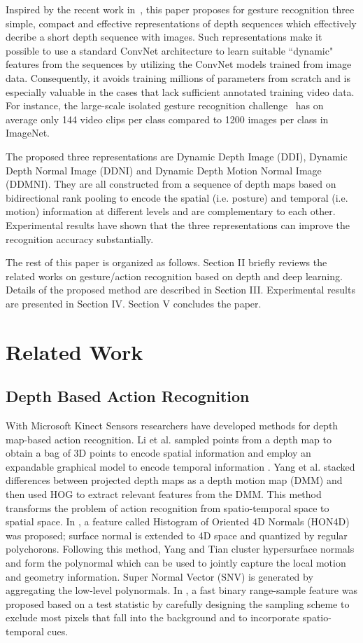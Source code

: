\documentclass[10pt, a4paper, conference]{IEEEtran}
\begin{document}
Inspired by the recent work in~\cite{pichao2015,pichaoTHMS,pichao2016,bilen2016dynamic}, this paper proposes for gesture recognition three simple, compact and effective representations of depth sequences which effectively decribe a short depth sequence with images. Such representations make it possible to use a standard ConvNet architecture to learn suitable ``dynamic" features from the sequences by utilizing the ConvNet models trained from image data. Consequently, it avoids training millions of parameters from scratch and is especially valuable in the cases that lack sufficient annotated training video data. For instance, the large-scale isolated gesture recognition challenge~\cite{wanchalearn} has on average only 144 video clips per class compared to 1200 images per class in ImageNet.


The proposed three representations are Dynamic Depth Image (DDI), Dynamic Depth Normal Image (DDNI) and Dynamic Depth Motion Normal Image (DDMNI). They are all constructed from a sequence of depth maps based on bidirectional rank pooling to encode the spatial (i.e. posture) and temporal (i.e. motion) information at different levels and are complementary to each other. Experimental results have shown that the three representations can improve the recognition accuracy substantially.

The rest of this paper is organized as follows. Section II briefly reviews the related works on gesture/action recognition based on depth and deep learning. Details of the proposed method are described in Section III. Experimental results are presented in Section IV. Section V concludes the paper.

\section{Related Work}
\subsection{Depth Based Action Recognition}
With Microsoft Kinect Sensors researchers have developed methods for depth map-based action recognition. Li et al. \cite{li2010action} sampled points
from a depth map to obtain a bag of 3D points to encode spatial information and
employ an expandable graphical model to encode temporal information
\cite{li2008}. Yang et al. \cite{Yang2012a} stacked differences between projected depth maps as
a depth motion map (DMM) and then used HOG to extract relevant features from the
DMM. This method transforms the problem of action recognition from
spatio-temporal space to spatial space.  In \cite{Oreifej2013}, a feature called Histogram of Oriented 4D
Normals (HON4D) was proposed; surface normal is extended to 4D space and
quantized by regular polychorons. Following this method, Yang and Tian
\cite{yangsuper} cluster hypersurface normals and form the polynormal which can
be used to jointly capture the local motion and geometry information. Super
Normal Vector (SNV) is generated by aggregating the low-level polynormals. In
\cite{lurange}, a fast binary range-sample feature was proposed based on a test
statistic by carefully designing the sampling scheme to exclude most pixels that
fall into the background and to incorporate spatio-temporal cues.
\end{document}

